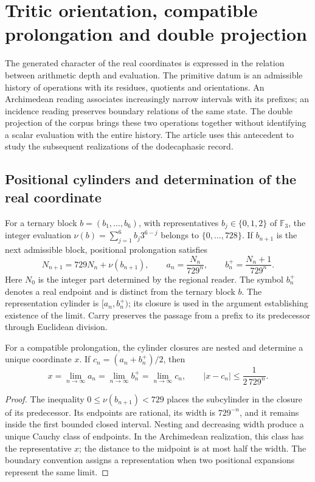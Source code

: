 \section{Tritic orientation, compatible prolongation and double projection}
\label{sec:trit-projection}

The generated character of the real coordinates is expressed in the relation
between arithmetic depth and evaluation. The primitive datum is an admissible
history of operations with its residues, quotients and orientations. An
Archimedean reading associates increasingly narrow intervals with its prefixes;
an incidence reading preserves boundary relations of the same state.
The double projection of the corpus \cite{hmtI,HMT-IX} brings these two operations together
without identifying a scalar evaluation with the entire history. The
article uses this antecedent to study the subsequent realizations
of the dodecaphasic record.

\subsection{Positional cylinders and determination of the real coordinate}

For a ternary block \(b=(b_1,\ldots,b_6)\), with representatives
\(b_j\in\{0,1,2\}\) of \(\mathbb F_3\), the integer evaluation
\(\nu(b)=\sum_{j=1}^6b_j3^{6-j}\) belongs to
\(\{0,\ldots,728\}\). If \(b_{n+1}\) is the next admissible block,
positional prolongation satisfies
\[
 N_{n+1}=729N_n+\nu(b_{n+1}),\qquad
 a_n=\frac{N_n}{729^n},\qquad b_n^+=\frac{N_n+1}{729^n}.
\]
Here \(N_0\) is the integer part determined by the regional reader. The symbol
\(b_n^+\) denotes a real endpoint and is distinct from the ternary block \(b\).
The representation cylinder is \([a_n,b_n^+)\); its closure is used
in the argument establishing existence of the limit. Carry preserves the passage from
a prefix to its predecessor through Euclidean division.

\begin{proposition}
For a compatible prolongation, the cylinder closures are
nested and determine a unique coordinate \(x\). If
\(c_n=(a_n+b_n^+)/2\), then
\[
 x=\lim_{n\to\infty}a_n=\lim_{n\to\infty}b_n^+
 =\lim_{n\to\infty}c_n,\qquad
 |x-c_n|\leq\frac1{2\,729^n}.
\]
\end{proposition}
\begin{proof}
The inequality \(0\leq\nu(b_{n+1})<729\) places the subcylinder in
the closure of its predecessor. Its endpoints are rational, its width is
\(729^{-n}\), and it remains inside the first bounded closed interval.
Nesting and decreasing width produce a unique Cauchy
class of endpoints. In the Archimedean realization, this class has the
representative \(x\); the distance to the midpoint is at most half
the width. The boundary convention assigns a representation when two
positional expansions represent the same limit.
\end{proof}

